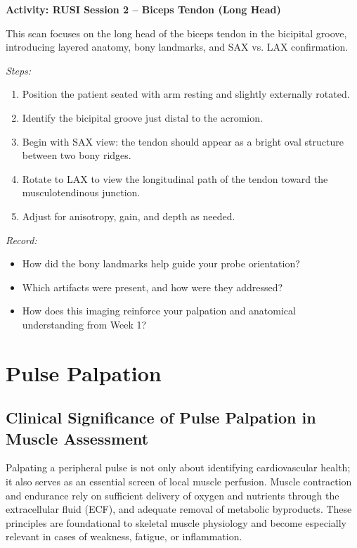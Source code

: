 \begin{labactivitybox}
\textbf{Activity: RUSI Session 2 – Biceps Tendon (Long Head)}

This scan focuses on the long head of the biceps tendon in the bicipital groove, introducing layered anatomy, bony landmarks, and SAX vs. LAX confirmation.

\textit{Steps:}
\begin{enumerate}
  \item Position the patient seated with arm resting and slightly externally rotated.
  \item Identify the bicipital groove just distal to the acromion.
  \item Begin with SAX view: the tendon should appear as a bright oval structure between two bony ridges.
  \item Rotate to LAX to view the longitudinal path of the tendon toward the musculotendinous junction.
  \item Adjust for anisotropy, gain, and depth as needed.
\end{enumerate}

\textit{Record:}
\begin{itemize}
  \item How did the bony landmarks help guide your probe orientation?
  \item Which artifacts were present, and how were they addressed?
  \item How does this imaging reinforce your palpation and anatomical understanding from Week 1?
\end{itemize}
\end{labactivitybox}

\section*{Pulse Palpation}

\subsection*{Clinical Significance of Pulse Palpation in Muscle Assessment}

Palpating a peripheral pulse is not only about identifying cardiovascular health; it also serves as an essential screen of local muscle perfusion. Muscle contraction and endurance rely on sufficient delivery of oxygen and nutrients through the extracellular fluid (ECF), and adequate removal of metabolic byproducts. These principles are foundational to skeletal muscle physiology and become especially relevant in cases of weakness, fatigue, or inflammation.

